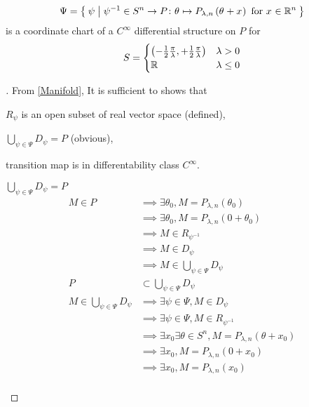 \documentclass[../main.tex]{subfiles}
\begin{document}
\begin{lemma}\label{M:CoordinateChart}
\begin{equation*}
\Psi=\Set{\psi|
\psi^{-1}
\in S^n\to P
\colon\tensor{\theta}{}\mapsto P_{\lambda,n}\left(\tensor{\theta}{}+\tensor{x}{}\right)
\text{ for }
\tensor{x}{}\in\R^n
}
\end{equation*} is a coordinate chart of a $C^\infty$ differential structure on $P$
for\begin{equation*}
S=
\begin{cases}
\left(-\frac{1}{2}\frac{\pi}{\lambda},+\frac{1}{2}\frac{\pi}{\lambda}\right)&\text{$\lambda>0$}\\
\mathbb{R}&\text{$\lambda\le0$}
\end{cases}
\end{equation*}
\end{lemma}
\begin{proof}[]
From \cref{Manifold}, It is sufficient to shows that
\begin{APAenumerate}
\item $R_\psi$ is an open subset of real vector space (defined),
\item $\bigcup_{\psi\in\Psi} D_\psi=P$ (obvious),
\item transition map is in differentability class $C^\infty$.
\end{APAenumerate}
\begin{subproof}{$\bigcup_{\psi\in\Psi} D_\psi=P$}
\begin{align*}
M\in P
&\implies\exists\theta_0, M=P_{\lambda,n}\left(\theta_0\right)\\
&\implies\exists\theta_0, M=P_{\lambda,n}\left(0 +\theta_0\right)\\
&\implies M\in R_{\psi^{-1}}\\
&\implies M\in D_{\psi}\\
&\implies M\in\bigcup_{\psi\in\Psi} D_\psi\\
P&\subset\bigcup_{\psi\in\Psi}D_\psi\\
M\in\bigcup_{\psi\in\Psi} D_\psi
&\implies\exists\psi\in\Psi, M\in D_\psi\\
&\implies\exists\psi\in\Psi, M\in R_{\psi^{-1}}\\
&\implies\exists x_0\exists\theta\in S^n, M=P_{\lambda,n}\left(\theta+x_0\right)\\
&\implies\exists x_0, M=P_{\lambda,n}\left(0+x_0\right)\\
&\implies\exists x_0, M=P_{\lambda,n}\left(x_0\right)\\

\end{align*}
\end{subproof}
\end{proof}
\end{document}
